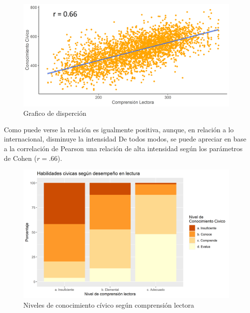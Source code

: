 \documentclass[12pt,twoside]{templates/facsothesis}
\begin{document}
\begin{figure}

{\centering \includegraphics[width=0.8\linewidth]{images/scater} 

}

\caption{Grafico de disperción}\label{fig:unnamed-chunk-9}
\end{figure}

Como puede verse la relación es igualmente positiva, aunque, en relación a lo internacional, disminuye la intensidad De todos modos, se puede apreciar en base a la correlación de Pearson una relación de alta intensidad según los parámetros de Cohen (\(r= .66\)).

\begin{figure}

{\centering \includegraphics[width=0.8\linewidth]{images/graficobivariadocategorico} 

}

\caption{Niveles de conocimiento cívico según comprensión lectora}\label{fig:unnamed-chunk-11}
\end{figure}
\end{document}
